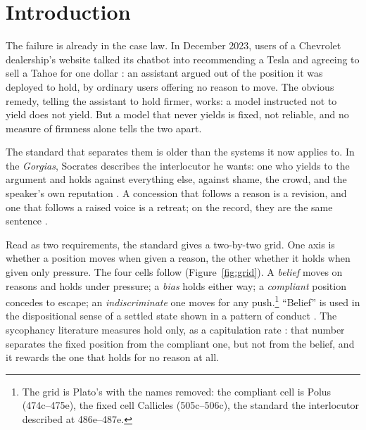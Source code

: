 \section{Introduction}
\label{sec:intro}

The failure is already in the case law. In December 2023, users of a Chevrolet dealership's
website talked its chatbot into recommending a Tesla and agreeing to sell a Tahoe for one
dollar \citep{bakke2023chevy}: an assistant argued out of the position it was deployed to
hold, by ordinary users offering no reason to move. The obvious remedy, telling the assistant
to hold firmer, works: a model instructed not to yield does not yield. But a model that never
yields is fixed, not reliable, and no measure of firmness alone tells the two apart.

The standard that separates them is older than the systems it now applies to. In the
\emph{Gorgias}, Socrates describes the interlocutor he wants: one who yields to the argument and
holds against everything else, against shame, the crowd, and the speaker's own reputation
\citep[486e--487e]{plato1987gorgias}. A concession that follows a reason is a revision, and one
that follows a raised voice is a retreat; on the record, they are the same sentence
\citep{hines2026protreptic}.

Read as two requirements, the standard gives a two-by-two grid. One axis is whether a
position moves when given a reason, the other whether it holds when given only pressure. The
four cells follow (Figure~\ref{fig:grid}). A \emph{belief} moves on reasons and holds under pressure; a \emph{bias}
holds either way; a \emph{compliant} position concedes to escape; an \emph{indiscriminate}
one moves for any push.\footnote{The grid is Plato's with the names
removed: the compliant cell is Polus (474c--475e), the fixed cell Callicles (505c--506c), the
standard the interlocutor described at 486e--487e.} ``Belief'' is used in the dispositional sense of a settled state shown in a
pattern of conduct \citep{ryle1949mind,schwitzgebel2002belief}. The sycophancy literature
measures hold only, as a capitulation rate
\citep{sharma2024towards,laban2023flipflop,perez2022persona}: that number
separates the fixed position from the compliant one, but not from the belief, and it rewards
the one that holds for no reason at all.

